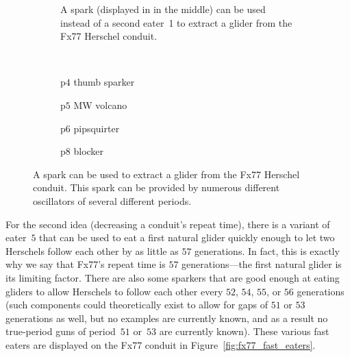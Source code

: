 \begin{figure}[!htb]
	\centering
	\begin{subfigure}{\textwidth}
		\centering
		    
		\caption{A spark (displayed in  in the middle) can be used instead of a second eater~1 to extract a glider from the Fx77 Herschel conduit.}
		\label{fig:fx77_extract_spark}
	\end{subfigure} \\[0.5cm]
	\begin{subfigure}{0.23\textwidth}
		\centering
		\caption{p$4$ thumb sparker}
		\label{fig:fx77_extract_p4}
	\end{subfigure} \hfill \begin{subfigure}{.23\textwidth}
		\centering
		\caption{p$5$ MW volcano}
		\label{fig:fx77_extract_p5}
	\end{subfigure} \hfill \begin{subfigure}{.22\textwidth}
		\centering
		\caption{p$6$ pipsquirter}
		\label{fig:fx77_extract_p6}
	\end{subfigure} \hfill \begin{subfigure}{.25\textwidth}
		\centering
		\caption{p$8$ blocker}
		\label{fig:fx77_extract_p8}
	\end{subfigure}
	\caption{A spark can be used to extract a glider from the Fx77 Herschel conduit. This spark can be provided by numerous different oscillators of several different periods.}\label{fig:fx77_extract}
\end{figure}

For the second idea (decreasing a conduit's repeat time), there is a variant of eater~$5$ that can be used to eat a first natural glider quickly enough to let two Herschels follow each other by as little as $57$ generations. In fact, this is exactly why we say that Fx77's repeat time is $57$ generations---the first natural glider is its limiting factor. There are also some sparkers that are good enough at eating gliders to allow Herschels to follow each other every $52$, $54$, $55$, or $56$ generations (such components could theoretically exist to allow for gaps of $51$ or $53$ generations as well, but no examples are currently known, and as a result no true-period guns of period~$51$ or~$53$ are currently known). These various fast eaters are displayed on the Fx77 conduit in Figure~\ref{fig:fx77_fast_eaters}.

